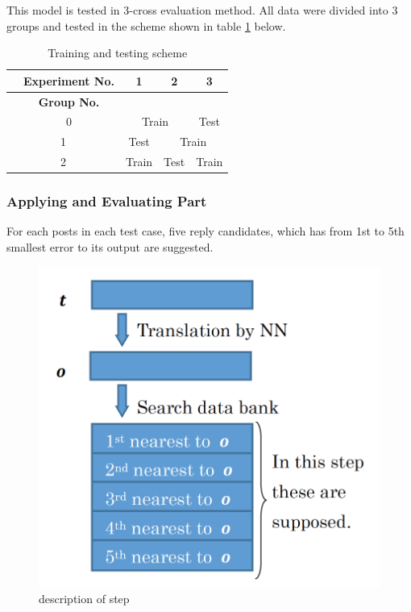 \documentclass{../style/sig-alternate}
\begin{document}
This model is tested in 3-cross evaluation method.
All data were divided into 3 groups and tested in the scheme shown in table \ref{tab:testing_scheme} below.

\begin{table}[h!]
  \centering
  \caption{Training and testing scheme}
  \label{tab:testing_scheme}
  \begin{tabular}{|c|c|c|c|} \hline
    　{\bf Experiment No.} & 1 & 2 & 3 \\ \hline
    　{\bf Group No.} & & & \\ \hline
    　0 & \multicolumn{2}{|c|}{Train} & Test \\ \hline
    1 & Test & \multicolumn{2}{|c|}{Train} \\ \hline
    2 & Train & Test & Train \\ \hline
  \end{tabular}
\end{table}

\subsubsection{Applying and Evaluating Part}
\label{sec:applying}

For each posts in each test case, five reply candidates, which has from 1st to 5th smallest error to its output are suggested.

\begin{figure}[h!]
 \begin{center}
  \includegraphics[width=120mm,bb=0 0 616 579]{../img/peter_fig01.png}
  \end{center}
  \caption{description of step}
  \label{fig:applying}
\end{figure}
\end{document}
